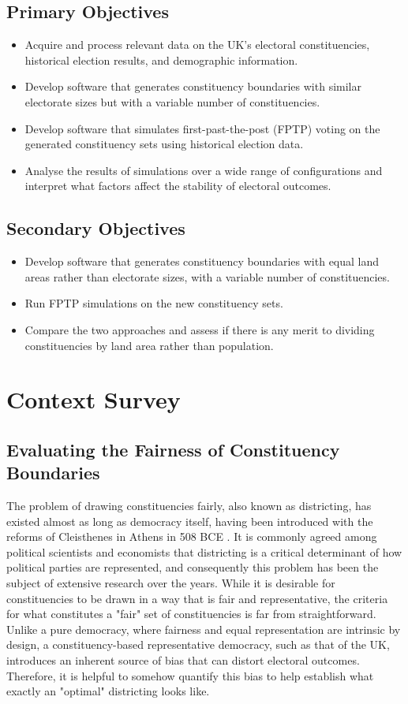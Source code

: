 \documentclass{article}
\begin{document}
\subsection{Primary Objectives}
\begin{itemize}
    \item Acquire and process relevant data on the UK's electoral constituencies, historical election results, and demographic information.
    \item Develop software that generates constituency boundaries with similar electorate sizes but with a variable number of constituencies.
    \item Develop software that simulates first-past-the-post (FPTP) voting on the generated constituency sets using historical election data.
    \item Analyse the results of simulations over a wide range of configurations and interpret what factors affect the stability of electoral outcomes.
\end{itemize}
\subsection{Secondary Objectives}
\begin{itemize}
    \item Develop software that generates constituency boundaries with equal land areas rather than electorate sizes, with a variable number of constituencies.
    \item Run FPTP simulations on the new constituency sets.
    \item Compare the two approaches and assess if there is any merit to dividing constituencies by land area rather than population.
\end{itemize}

\section{Context Survey}

\subsection{Evaluating the Fairness of Constituency Boundaries}
The problem of drawing constituencies fairly, also known as districting, has existed almost as long as democracy itself, having been
introduced with the reforms of Cleisthenes in Athens in 508 BCE \cite{cleisthenes}. It is commonly agreed among political scientists and economists that districting is a 
critical determinant of how political parties are represented, and consequently this problem has been the subject of extensive research over the years.
While it is desirable for constituencies to be drawn in a way that is fair and representative, the criteria for what constitutes a "fair" set of constituencies
is far from straightforward. Unlike a pure democracy, where fairness and equal representation are intrinsic by design, a constituency-based representative
democracy, such as that of the UK, introduces an inherent source of bias that can distort electoral outcomes. Therefore, it is helpful to somehow quantify this
bias to help establish what exactly an "optimal" districting looks like.
\end{document}
